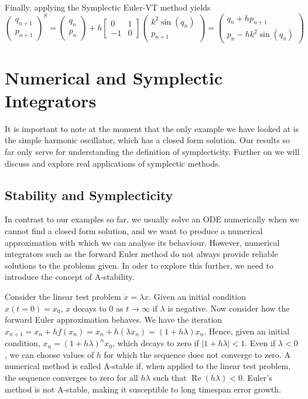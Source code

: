 \documentclass{report}
\theoremstyle{exampstyle} \newtheorem{example}[theorem]{Example}
\theoremstyle{exampstyle} \newtheorem{remark}[theorem]{Remark}
\theoremstyle{exampstyle} \newtheorem{definition}[theorem]{Definition}
\theoremstyle{exampstyle} \newtheorem{lemma}[theorem]{Lemma}
\begin{document}
Finally, applying the Symplectic Euler-VT method yields
\begin{equation}
	\begin{pmatrix}
		q_{n+1} \\
		p_{n+1}
	\end{pmatrix}^S = \begin{pmatrix}
		q_n \\
		p_n
	\end{pmatrix} + h \begin{bmatrix}
		0 & 1 \\
		-1 & 0
	\end{bmatrix} \begin{pmatrix}
		k^2 \sin(q_n) \\
		p_{n+1}
	\end{pmatrix} = \begin{pmatrix}
		q_n + h p_{n+1} \\
		p_n - h k^2 \sin(q_n)
	\end{pmatrix}
\end{equation}

\section{Numerical and Symplectic Integrators}

It is important to note at the moment that the only example we have looked at is the simple harmonic oscillator, which has a closed form solution.
Our results so far only serve for understanding the definition of symplecticity.
Further on we will discuss and explore real applications of symplectic methods.



\subsection{Stability and Symplecticity}
In contrast to our examples so far, we usually solve an ODE numerically when we cannot find a closed form solution, and we want to produce a numerical approximation with which we can analyse its behaviour.
However, numerical integrators such as the forward Euler method do not always provide reliable solutions to the problems given.
In oder to explore this further, we need to introduce the concept of A-stability.

Consider the linear test problem $\dot{x} = \lambda x$. Given an initial condition $x(t=0) = x_0$, $x$ decays to $0$ as $t \rightarrow \infty$ if $\lambda$ is negative.
Now consider how the forward Euler approximation behaves.
We have the iteration $x_{n+1} = x_n + hf(x_n) = x_n + h(\lambda x_n) = (1 + h\lambda)x_n$.
Hence, given an initial condition, $x_n = (1 + h\lambda)^n x_0$, which decays to zero if $|1+h\lambda| < 1$.
Even if $\lambda < 0$, we can choose values of $h$ for which the sequence does not converge to zero.
A numerical method is called A-stable if, when applied to the linear test problem, the sequence converges to zero for all $h\lambda$ such that $\operatorname{Re}(h\lambda) < 0$.
Euler's method is not A-stable, making it susceptible to long timespan error growth.
\end{document}
